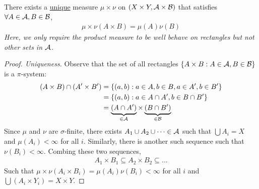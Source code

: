 \documentclass[11pt]{article}
\begin{document}
	\begin{theorem}
		There exists a \ul{unique} measure $\mu \times \nu$ on $(X \times Y, \mathcal{{A}} \times \mathcal{{B}})$ that satisfies $\forall A \in \mathcal{{A}}, B \in \mathcal{{B}}$,
		\begin{align}
			\mu \times \nu(A \times B) = \mu(A) \nu(B)
		\end{align}
		\emph{Here, we only require the product measure to be well behave on rectangles but not other sets in $\mathcal{{A}}$.}
		\begin{proof}[Proof. Uniqueness]
			Observe that the set of all rectangles $\{A \times B : A \in \mathcal{{A}}, B \in \mathcal{{B}}\}$ is a $\pi$-system:
			\begin{align}
				(A\times B) \cap (A' \times B') &= \{(a, b) : a \in A, b \in B, a \in A', b \in B'\} \\
				&= \{(a, b) : a \in A \cap A', b \in B \cap B'\} \\
				&= \underbrace{(A \cap A')}_{\in \mathcal{{A}}} \times \underbrace{(B \cap B')}_{\in \mathcal{{B}}}
			\end{align}
			Since $\mu$ and $\nu$ are $\sigma$-finite, there exists $A_1 \cup A_2 \cup \dots \in \mathcal{{A}}$ such that $\bigcup A_i = X$ and $\mu(A_i) < \infty$ for all $i$. Similarly, there is another such sequence such that $\nu(B_i) < \infty$.
			Combing these two sequences,
			\begin{align}
				A_1 \times B_1 \subseteq A_2 \times B_2 \subseteq \dots
			\end{align}
			Such that $\mu \times \nu(A_i \times B_i) = \mu(A_i) \nu(B_i) < \infty$ for all $i$ and $\bigcup (A_i \times Y_i) = X \times Y$.
			

\end{proof}
\end{theorem}
\end{document}
